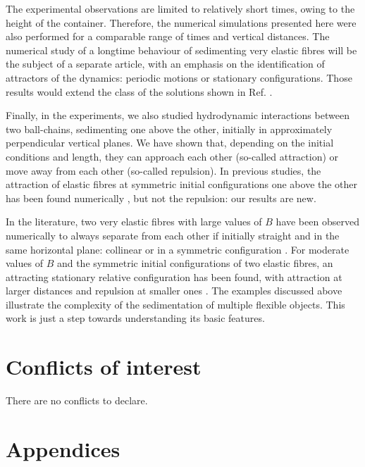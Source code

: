 \documentclass{article}
\begin{document}
The experimental observations are limited to relatively short times, owing to the height of the container. Therefore, the numerical simulations presented here were also performed for a comparable range of times and vertical distances.
The numerical study of a longtime behaviour of sedimenting very elastic fibres will be the subject of a separate article, with an emphasis on the identification of attractors of the dynamics: periodic motions or stationary configurations. Those results would extend the class of the solutions shown in Ref. \cite{saggiorato2015conformations}.

Finally, in the experiments, we also studied hydrodynamic interactions between two ball-chains, sedimenting one above the other, initially in approximately perpendicular vertical planes. We have shown that, depending on the initial conditions and length, they can approach each other (so-called attraction) or move away from each other (so-called repulsion). In previous studies, the attraction of elastic fibres at symmetric initial configurations one above the other has been found numerically \cite{llopis2007sedimentation,saggiorato2015conformations}, but not the repulsion: our results are new. 

In the literature, two very elastic fibres with large values of $B$ have been observed numerically to always separate from each other if initially  straight and in the same horizontal  plane: collinear \cite{llopis2007sedimentation} or in a symmetric configuration \cite{bukowicki2019sedimenting}. For moderate values of $B$ and the symmetric initial configurations of two elastic fibres, an attracting  stationary relative configuration has been found, with attraction at larger distances and repulsion at smaller ones \cite{bukowicki2019sedimenting,bukowickiJFM}.
The examples discussed above illustrate the complexity of the sedimentation of multiple flexible objects. This work is just a step towards understanding its basic features.




\section*{Conflicts of interest}
There are no conflicts to declare.


\appendix

\section*{Appendices}
\end{document}

